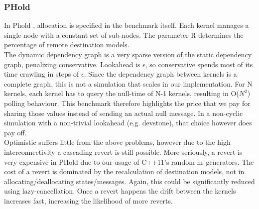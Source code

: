 \subsubsection{PHold}
In Phold \cite{PHOLD}, allocation is specified in the benchmark itself. Each kernel manages a single node with a constant set of sub-nodes. The parameter R determines the percentage of remote destination models.\\
The dynamic dependency graph is a very sparse version of the static dependency graph, penalizing conservative. Lookahead is $\epsilon$, so conservative spends most of its time crawling in steps of $\epsilon$. Since the dependency graph between kernels is a complete graph, this is not a simulation that scales in our implementation. For N kernels, each kernel has to query the null-time of N-1 kernels, resulting in O($N^2$) polling behaviour. This benchmark therefore highlights the price that we pay for sharing those values instead of sending an actual null message. In a non-cyclic simulation with a non-trivial lookahead (e.g. devstone), that choice however does pay off.\\
Optimistic suffers little from the above problems, however due to the high interconnectivity a cascading revert is still possible. More seriously, a revert is very expensive in PHold due to our usage of C++11's random nr generators. The cost of a revert is dominated by the recalculation of destination models, not in allocating/deallocating states/messages. Again, this could be significantly reduced using lazy-cancellation. Once a revert happens the drift between the kernels increases fast, increasing the likelihood of more reverts. 
